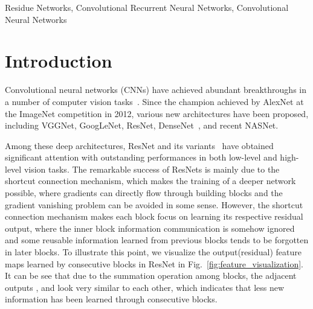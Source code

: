\documentclass[journal,comsoc]{IEEEtran}
\begin{document}
\begin{IEEEkeywords}
Residue Networks, Convolutional Recurrent Neural Networks, Convolutional Neural Networks
\end{IEEEkeywords}






\IEEEpeerreviewmaketitle


\section{Introduction}
Convolutional neural networks (CNNs) have achieved abundant breakthroughs in a number of computer vision tasks~\cite{lecun1995convolutional}. Since the champion achieved by AlexNet\cite{NIPS2012_4824} at the ImageNet competition in 2012, various new architectures have been proposed, including  VGGNet\cite{DBLP:journals/corr/SimonyanZ14a}, GoogLeNet\cite{DBLP:journals/corr/SzegedyLJSRAEVR14}, ResNet\cite{DBLP:journals/corr/HeZRS15}, DenseNet~\cite{DBLP:journals/corr/HuangLW16a}, and recent NASNet\cite{DBLP:journals/corr/ZophVSL17}. 


Among these deep architectures, ResNet and its variants~\cite{DBLP:journals/corr/ZagoruykoK16,DBLP:journals/corr/SzegedyIV16,DBLP:journals/corr/XieGDTH16,DBLP:journals/corr/abs-1709-01507} have obtained significant attention with outstanding performances in both low-level and high-level vision tasks. The remarkable success of ResNets is mainly due to the shortcut connection mechanism, which makes the training of a deeper network possible, where gradients can directly flow through building blocks and the gradient vanishing problem can be avoided in some sense. However, the shortcut connection mechanism makes each block focus on learning its respective residual output, where the inner block information communication is somehow ignored and some reusable information learned from previous blocks tends to be forgotten in later blocks. 
To illustrate this point, we visualize the output(residual) feature maps learned by consecutive blocks in ResNet in Fig.~\ref{fig:feature_visualization}. It can be see that due to the summation operation among blocks, the adjacent outputs ,  and  look very similar to each other, which indicates that less new information has been learned through  consecutive blocks.
\end{document}
